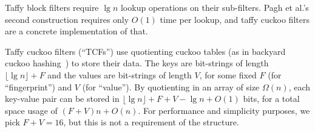 \documentclass[letterpaper,twocolumn,10pt]{article}
\newcommand{\etal}{et al.}
\begin{document}


Taffy block filters require $\lg n$ lookup operations on their sub-filters.
Pagh \etal{}'s second construction requires only $O(1)$ time per lookup, and taffy cuckoo filters are a concrete implementation of that.

Taffy cuckoo filters (``TCFs'') use quotienting cuckoo tables (as in backyard cuckoo hashing~\cite{backyard}) to store their data.
The keys are bit-strings of length $\lfloor \lg n \rfloor + F$ and the values are bit-strings of length $V$, for some fixed $F$ (for ``fingerprint'') and $V$ (for ``value'').
By quotienting in an array of size $\Omega(n)$, each key-value pair can be stored in $\lfloor \lg n \rfloor + F + V - \lg n + O(1)$ bits, for a total space usage of $(F+V)n + O(n)$.
For performance and simplicity purposes, we pick $F + V = 16$, but this is not a requirement of the structure.


\end{document}
